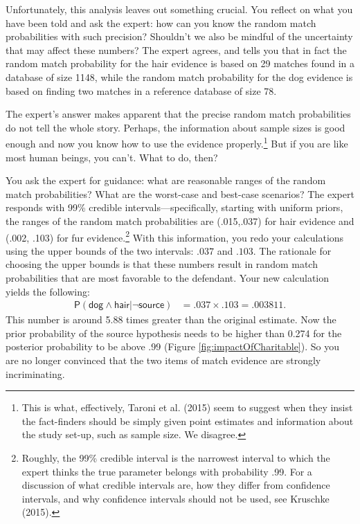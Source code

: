 \documentclass[
  10pt,
  dvipsnames,enabledeprecatedfontcommands]{scrartcl}
\newcommand{\s}[1]{\mbox{$\mathsf{#1}$}}
\begin{document}
Unfortunately, this analysis leaves out something crucial. You reflect
on what you have been told and ask the expert: how can you know the
random match probabilities with such precision? Shouldn't we also be
mindful of the uncertainty that may affect these numbers? The expert
agrees, and tells you that in fact the random match probability for the
hair evidence is based on 29 matches found in a database of size 1148,
while the random match probability for the dog evidence is based on
finding two matches in a reference database of size 78.

The expert's answer makes apparent that the precise random match
probabilities do not tell the whole story. Perhaps, the information
about sample sizes is good enough and now you know how to use the
evidence properly.\footnote{This is what, effectively, Taroni et al.
  (2015) seem to suggest when they insist the fact-finders should be
  simply given point estimates and information about the study set-up,
  such as sample size. We disagree.} But if you are like most human
beings, you can't. What to do, then?

You ask the expert for guidance: what are reasonable ranges of the
random match probabilities? What are the worst-case and best-case
scenarios? The expert responds with 99\% credible
intervals---specifically, starting with uniform priors, the ranges of
the random match probabilities are (.015,.037) for hair evidence and
(.002, .103) for fur evidence.\footnote{Roughly, the 99\% credible
  interval is the narrowest interval to which the expert thinks the true
  parameter belongs with probability .99. For a discussion of what
  credible intervals are, how they differ from confidence intervals, and
  why confidence intervals should not be used, see Kruschke (2015).}
With this information, you redo your calculations using the upper bounds
of the two intervals: \(.037\) and \(.103\). The rationale for choosing
the upper bounds is that these numbers result in random match
probabilities that are most favorable to the defendant. Your new
calculation yields the following: \begin{align*}
\mathsf{P}(\s{dog}\wedge \s{hair} \vert \neg \s{source})   & =  .037 \times .103 =.003811.
\end{align*} This number is around 5.88 times greater than the original
estimate. Now the prior probability of the source hypothesis needs to be
higher than 0.274 for the posterior probability to be above .99 (Figure
\ref{fig:impactOfCharitable}). So you are no longer convinced that the
two items of match evidence are strongly incriminating.
\end{document}
